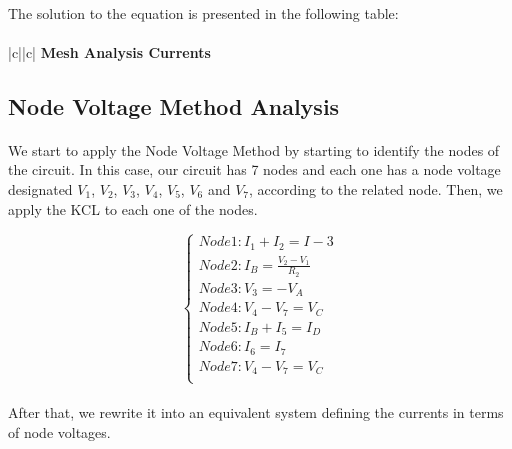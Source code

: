 \paragraph{}
The solution to the equation is presented in the following table:
\paragraph{}
\begin{center}
\begin{tabular}{|c||c|}
      \hline    
       {\bf Mesh Analysis Currents} \\
      \hline

	
     
      \end{tabular}
\end{center}


 


\subsection{Node Voltage Method Analysis}

\paragraph{}
We start to apply the Node Voltage Method by starting to identify the nodes of the circuit. In this case, our circuit has 7 nodes and each one has a node voltage designated $V_1$, $V_2$, $V_3$, $V_4$, $V_5$, $V_6$ and $V_7$, according to the related node. Then, we apply the KCL to each one of the nodes.

\[
\left\{\begin{matrix}
Node 1: I_1 + I_2 = I-3\\
Node 2: I_B=\frac{V_2-V_1}{R_2}\\
Node 3: V_3=-V_A\\
Node 4: V_4 - V_7 = V_C\\
Node 5: I_B + I_5 = I_D\\
Node 6: I_6 = I_7\\
Node 7: V_4 - V_7 = V_C\\
\end{matrix}\right.
\]

\paragraph{}
After that, we rewrite it into an equivalent system defining the currents in terms of node voltages.

